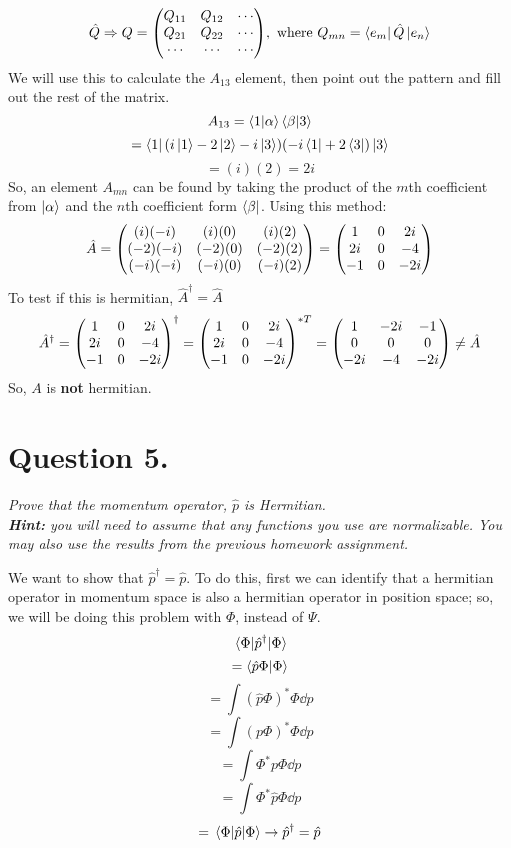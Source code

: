 \documentclass[12pt]{article}
\begin{document}
\begin{enumerate}[label=\alph*)]
\[\hat{Q} \Rightarrow Q = \mqty(Q_{11} & Q_{12} & \cdots \\ Q_{21} & Q_{22} & \cdots \\ \cdots & \cdots & \cdots), \text{ where } Q_{mn} = \bra{e_m}\hat{Q}\ket{e_n}\]
We will use this to calculate the $A_{13}$ element, then point out the pattern and fill out the rest of the matrix.
\[A_{13} = \braket{1}{\alpha}\braket{\beta}{3}\]
\[= \bra{1}(i\ket{1} -2\ket{2} -i\ket{3})(-i\bra{1} +2\bra{3})\ket{3}\]
\[= (i)(2) = 2i\]
So, an element $A_{mn}$ can be found by taking the product of the $m$th coefficient from $\ket{\alpha}$ and the $n$th coefficient form $\bra{\beta}$. Using this method:
\[\hat{A} = \mqty((i)(-i)&(i)(0)&(i)(2) \\ (-2)(-i)&(-2)(0)&(-2)(2) \\ (-i)(-i)&(-i)(0)&(-i)(2)) = \mqty(1&0&2i \\ 2i&0&-4 \\ -1&0&-2i)\]
To test if this is hermitian, $\hat{A}^\dagger = \hat{A}$
\[\hat{A}^\dagger = \mqty(1&0&2i \\ 2i&0&-4 \\ -1&0&-2i)^\dagger = \mqty(1&0&2i \\ 2i&0&-4 \\ -1&0&-2i)^{*T} = \mqty(1&-2i&-1 \\ 0&0&0 \\ -2i&-4&-2i) \neq \hat{A}\]
So, $A$ is \textbf{not} hermitian. 

\end{enumerate}

\newpage

\section*{Question 5.}
\emph{Prove that the momentum operator, $\hat{p}$ is Hermitian.}\\
\emph{\textbf{Hint:} you will need to assume that any functions you use are normalizable. You may also use the results from the previous homework assignment.}\bigskip

We want to show that $\hat{p}^\dagger = \hat{p}$. To do this, first we can identify that a hermitian operator in momentum space is also a hermitian operator in position space; so, we will be doing this problem with $\Phi$, instead of $\Psi$. 
\[\ev{\hat{p}^\dagger}{\Phi}\]
\[=\braket{\hat{p}\Phi}{\Phi}\]
\[=\int (\hat{p}\Phi)^* \Phi \dd{p}\]
\[=\int (p \Phi)^* \Phi \dd{p}\]
\[=\int \Phi^* p \Phi \dd{p}\]
\[=\int \Phi^* \hat{p} \Phi \dd{p}\]
\[= \ev{\hat{p}}{\Phi} \rightarrow \hat{p}^\dagger = \hat{p}\]
\end{document}

